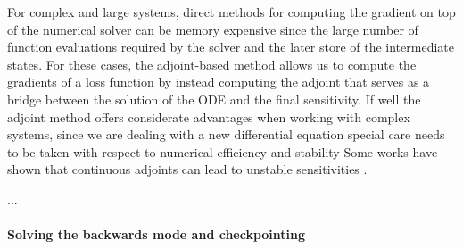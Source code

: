 For complex and large systems, direct methods for computing the gradient on top of the numerical solver can be memory expensive since the large number of function evaluations required by the solver and the later store of the intermediate states. 
For these cases, the adjoint-based method allows us to compute the gradients of a loss function by instead computing the adjoint that serves as a bridge between the solution of the ODE and the final sensitivity. 
If well the adjoint method offers considerate advantages when working with complex systems, since we are dealing with a new differential equation special care needs to be taken with respect to numerical efficiency and stability
Some works have shown that continuous adjoints can lead to unstable sensitivities \cite{Jensen_Nakshatrala_Tortorelli_2014}.

...

\paragraph{Solving the backwards mode and checkpointing}

